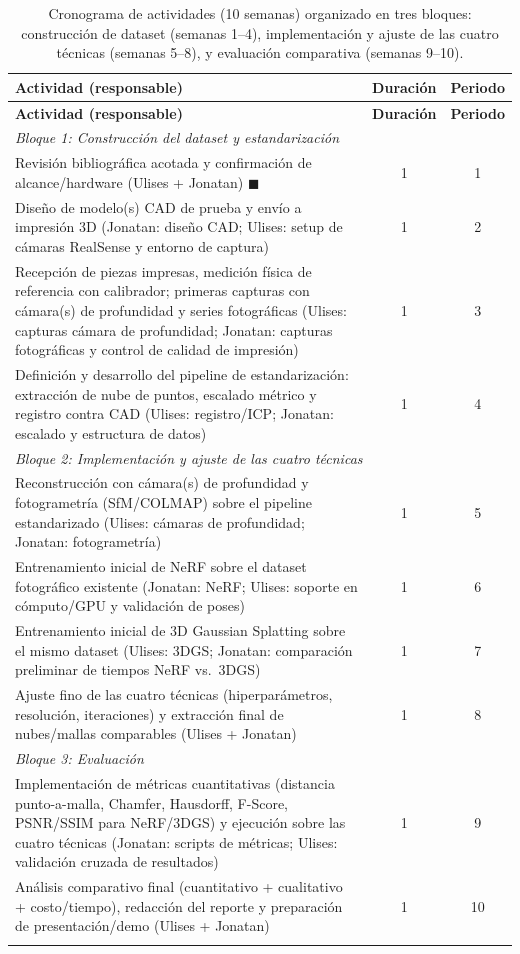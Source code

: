 \documentclass[11pt]{article}
\begin{document}
\begin{longtable}{p{7.2cm} c c}
\toprule
\textbf{Actividad (responsable)} & \textbf{Duraci\'on} & \textbf{Periodo} \\
\midrule
\endfirsthead
\toprule
\textbf{Actividad (responsable)} & \textbf{Duraci\'on} & \textbf{Periodo} \\
\midrule
\endhead
\multicolumn{3}{l}{\textit{Bloque 1: Construcci\'on del dataset y estandarizaci\'on}} \\
Revisi\'on bibliogr\'afica acotada y confirmaci\'on de alcance/hardware (Ulises + Jonatan) $\blacksquare$ & 1 & 1 \\
Dise\~no de modelo(s) CAD de prueba y env\'io a impresi\'on 3D (Jonatan: dise\~no CAD; Ulises: setup de c\'amaras RealSense y entorno de captura) & 1 & 2 \\
Recepci\'on de piezas impresas, medici\'on f\'isica de referencia con calibrador; primeras capturas con c\'amara(s) de profundidad y series fotogr\'aficas (Ulises: capturas c\'amara de profundidad; Jonatan: capturas fotogr\'aficas y control de calidad de impresi\'on) & 1 & 3 \\
Definici\'on y desarrollo del pipeline de estandarizaci\'on: extracci\'on de nube de puntos, escalado m\'etrico y registro contra CAD (Ulises: registro/ICP; Jonatan: escalado y estructura de datos) & 1 & 4 \\
\multicolumn{3}{l}{\textit{Bloque 2: Implementaci\'on y ajuste de las cuatro t\'ecnicas}} \\
Reconstrucci\'on con c\'amara(s) de profundidad y fotogrametr\'ia (SfM/COLMAP) sobre el pipeline estandarizado (Ulises: c\'amaras de profundidad; Jonatan: fotogrametr\'ia) & 1 & 5 \\
Entrenamiento inicial de NeRF sobre el dataset fotogr\'afico existente (Jonatan: NeRF; Ulises: soporte en c\'omputo/GPU y validaci\'on de poses) & 1 & 6 \\
Entrenamiento inicial de 3D Gaussian Splatting sobre el mismo dataset (Ulises: 3DGS; Jonatan: comparaci\'on preliminar de tiempos NeRF vs.\ 3DGS) & 1 & 7 \\
Ajuste fino de las cuatro t\'ecnicas (hiperpar\'ametros, resoluci\'on, iteraciones) y extracci\'on final de nubes/mallas comparables (Ulises + Jonatan) & 1 & 8 \\
\multicolumn{3}{l}{\textit{Bloque 3: Evaluaci\'on}} \\
Implementaci\'on de m\'etricas cuantitativas (distancia punto-a-malla, Chamfer, Hausdorff, F-Score, PSNR/SSIM para NeRF/3DGS) y ejecuci\'on sobre las cuatro t\'ecnicas (Jonatan: scripts de m\'etricas; Ulises: validaci\'on cruzada de resultados) & 1 & 9 \\
An\'alisis comparativo final (cuantitativo + cualitativo + costo/tiempo), redacci\'on del reporte y preparaci\'on de presentaci\'on/demo (Ulises + Jonatan) & 1 & 10 \\
\bottomrule
\caption{Cronograma de actividades (10 semanas) organizado en tres bloques: construcci\'on de dataset (semanas 1--4), implementaci\'on y ajuste de las cuatro t\'ecnicas (semanas 5--8), y evaluaci\'on comparativa (semanas 9--10).}
\label{tab:cronograma}
\end{longtable}
\end{document}
